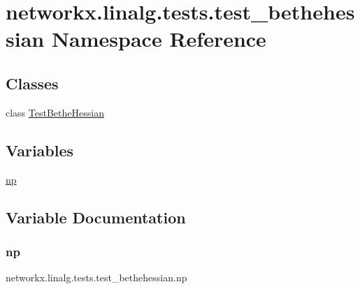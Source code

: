 \hypertarget{namespacenetworkx_1_1linalg_1_1tests_1_1test__bethehessian}{}\section{networkx.\+linalg.\+tests.\+test\+\_\+bethehessian Namespace Reference}
\label{namespacenetworkx_1_1linalg_1_1tests_1_1test__bethehessian}
\subsection*{Classes}
\begin{DoxyCompactItemize}
\item 
class \hyperlink{classnetworkx_1_1linalg_1_1tests_1_1test__bethehessian_1_1TestBetheHessian}{Test\+Bethe\+Hessian}
\end{DoxyCompactItemize}
\subsection*{Variables}
\begin{DoxyCompactItemize}
\item 
\hyperlink{namespacenetworkx_1_1linalg_1_1tests_1_1test__bethehessian_a8b27af4e0a9d0ad6745d12a72497a2e7}{np}
\end{DoxyCompactItemize}


\subsection{Variable Documentation}
\mbox{\label{namespacenetworkx_1_1linalg_1_1tests_1_1test__bethehessian_a8b27af4e0a9d0ad6745d12a72497a2e7}} 
\subsubsection{\texorpdfstring{np}{np}}
{\footnotesize\ttfamily networkx.\+linalg.\+tests.\+test\+\_\+bethehessian.\+np}

